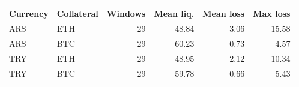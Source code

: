 \begin{tabular}{llrrrr}
\toprule
Currency & Collateral & Windows & Mean liq. & Mean loss & Max loss \\
\midrule
ARS & ETH & 29 & 48.84 & 3.06 & 15.58 \\
ARS & BTC & 29 & 60.23 & 0.73 & 4.57 \\
TRY & ETH & 29 & 48.95 & 2.12 & 10.34 \\
TRY & BTC & 29 & 59.78 & 0.66 & 5.43 \\
\bottomrule
\end{tabular}
